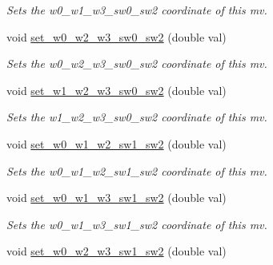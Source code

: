 \begin{DoxyCompactItemize}
\begin{DoxyCompactList}\small\item\em Sets the w0\-\_\-w1\-\_\-w3\-\_\-sw0\-\_\-sw2 coordinate of this mv. \end{DoxyCompactList}\item 
\hypertarget{classe3ga_1_1mv_aacbc88817c6d462e491e745fe7c21723}{void \hyperlink{classe3ga_1_1mv_aacbc88817c6d462e491e745fe7c21723}{set\-\_\-w0\-\_\-w2\-\_\-w3\-\_\-sw0\-\_\-sw2} (double val)}\label{classe3ga_1_1mv_aacbc88817c6d462e491e745fe7c21723}

\begin{DoxyCompactList}\small\item\em Sets the w0\-\_\-w2\-\_\-w3\-\_\-sw0\-\_\-sw2 coordinate of this mv. \end{DoxyCompactList}\item 
\hypertarget{classe3ga_1_1mv_a0f685dc92fd8c34b181570f60791393b}{void \hyperlink{classe3ga_1_1mv_a0f685dc92fd8c34b181570f60791393b}{set\-\_\-w1\-\_\-w2\-\_\-w3\-\_\-sw0\-\_\-sw2} (double val)}\label{classe3ga_1_1mv_a0f685dc92fd8c34b181570f60791393b}

\begin{DoxyCompactList}\small\item\em Sets the w1\-\_\-w2\-\_\-w3\-\_\-sw0\-\_\-sw2 coordinate of this mv. \end{DoxyCompactList}\item 
\hypertarget{classe3ga_1_1mv_adf69fc5e7b838dbb627e7c2738308460}{void \hyperlink{classe3ga_1_1mv_adf69fc5e7b838dbb627e7c2738308460}{set\-\_\-w0\-\_\-w1\-\_\-w2\-\_\-sw1\-\_\-sw2} (double val)}\label{classe3ga_1_1mv_adf69fc5e7b838dbb627e7c2738308460}

\begin{DoxyCompactList}\small\item\em Sets the w0\-\_\-w1\-\_\-w2\-\_\-sw1\-\_\-sw2 coordinate of this mv. \end{DoxyCompactList}\item 
\hypertarget{classe3ga_1_1mv_a3eda83ff54241e60d697f2c704165991}{void \hyperlink{classe3ga_1_1mv_a3eda83ff54241e60d697f2c704165991}{set\-\_\-w0\-\_\-w1\-\_\-w3\-\_\-sw1\-\_\-sw2} (double val)}\label{classe3ga_1_1mv_a3eda83ff54241e60d697f2c704165991}

\begin{DoxyCompactList}\small\item\em Sets the w0\-\_\-w1\-\_\-w3\-\_\-sw1\-\_\-sw2 coordinate of this mv. \end{DoxyCompactList}\item 
\hypertarget{classe3ga_1_1mv_ab77d0bb3f136326a7ccf71082c135960}{void \hyperlink{classe3ga_1_1mv_ab77d0bb3f136326a7ccf71082c135960}{set\-\_\-w0\-\_\-w2\-\_\-w3\-\_\-sw1\-\_\-sw2} (double val)}\label{classe3ga_1_1mv_ab77d0bb3f136326a7ccf71082c135960}


\end{DoxyCompactItemize}
